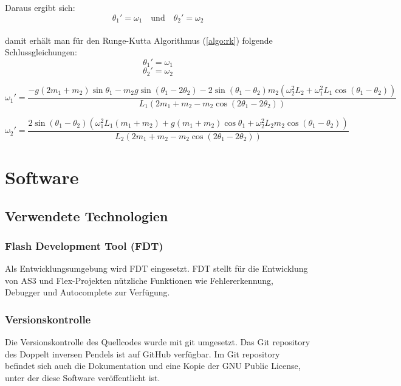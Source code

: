 \documentclass[12pt]{article}
\numberwithin{equation}{subsection}
\begin{document}
Daraus ergibt sich:
\begin{equation*}
	\theta_1' = \omega_1 \quad \text{und} \quad \theta_2' = \omega_2
\end{equation*}
\
\\
damit erhält man für den Runge-Kutta Algorithmus (\ref{algo:rk}) folgende Schlussgleichungen:
\begin{equation} \label{eq:rk:1}
	\theta_1' = \omega_1
\end{equation}
\begin{equation} \label{eq:rk:2}
	\theta_2' = \omega_2
\end{equation}

\begin{equation} \label{eq:rk:3}
	\omega_1' = \frac{-g(2m_1+m_2)\sin\theta_1 - m_2 g \sin(\theta_1 - 2\theta_2) -2\sin(\theta_1 - \theta_2)m_2(\omega_2^2 L_2 + \omega_1^2 L_1\cos(\theta_1 - \theta_2))}
	{L_1(2m_1 + m_2 - m_2 \cos(2\theta_1 - 2\theta_2))}
\end{equation}

\begin{equation} \label{eq:rk:4}
	\omega_2' = \frac{2\sin(\theta_1 - \theta_2)(\omega_1^2 L_1(m_1 + m_2) + g(m_1 + m_2)\cos\theta_1 + \omega_2^2 L_2 m_2 \cos(\theta_1 - \theta_2))}
	{L_2 (2m_1 + m_2 - m_2 \cos(2 \theta_1 - 2\theta_2))}
\end{equation}


\newpage
\section{Software}
\subsection{Verwendete Technologien}
\subsubsection{Flash Development Tool (FDT)}
Als Entwicklungsumgebung wird FDT \citep{fdt} eingesetzt. FDT stellt für die Entwicklung von AS3 und Flex-Projekten nützliche Funktionen wie Fehlererkennung, Debugger und Autocomplete zur Verfügung.

\subsubsection{Versionskontrolle}
Die Versionskontrolle des Quellcodes wurde mit git \citep{git} umgesetzt. Das Git repository des Doppelt inversen Pendels ist auf GitHub \citep{github} verfügbar. Im Git repository befindet sich auch die Dokumentation und eine Kopie der GNU Public License, unter der diese Software veröffentlicht ist.
\end{document}
